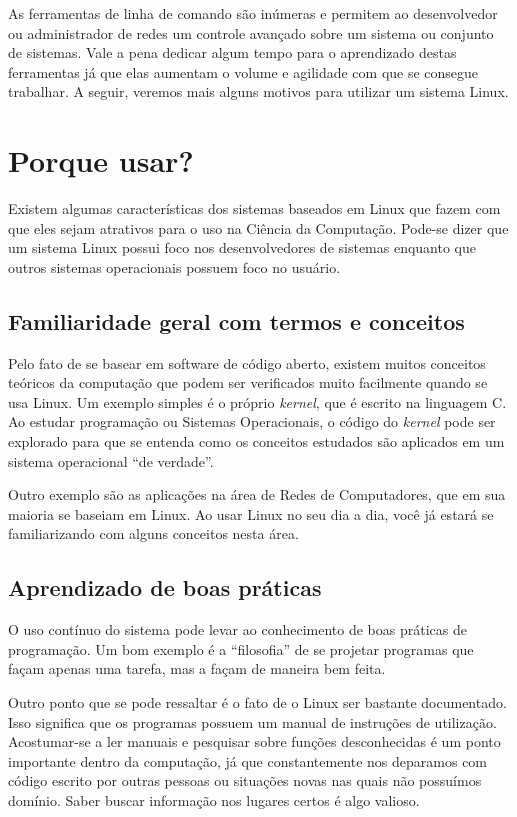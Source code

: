\documentclass{handout_utfpr}
\begin{document}
As ferramentas de linha de comando são inúmeras e permitem ao desenvolvedor ou administrador de redes um controle avançado sobre um sistema ou conjunto de sistemas. Vale a pena dedicar algum tempo para o aprendizado destas ferramentas já que elas aumentam o volume e agilidade com que se consegue trabalhar. A seguir, veremos mais alguns motivos para utilizar um sistema Linux.

\section{Porque usar?}
Existem algumas características dos sistemas baseados em Linux que fazem com que eles sejam atrativos para o uso na Ciência da Computação. Pode-se dizer que um sistema Linux possui foco nos desenvolvedores de sistemas enquanto que outros sistemas operacionais possuem foco no usuário.

\subsection{Familiaridade geral com termos e conceitos}
Pelo fato de se basear em software de código aberto, existem muitos conceitos teóricos da computação que podem ser verificados muito facilmente quando se usa Linux. Um exemplo simples é o próprio \textit{kernel}, que é escrito na linguagem C. Ao estudar programação ou Sistemas Operacionais, o código do \textit{kernel} pode ser explorado para que se entenda como os conceitos estudados são aplicados em um sistema operacional ``de verdade''.

Outro exemplo são as aplicações na área de Redes de Computadores, que em sua maioria se baseiam em Linux. Ao usar Linux no seu dia a dia, você já estará se familiarizando com alguns conceitos nesta área.

\subsection{Aprendizado de boas práticas}
O uso contínuo do sistema pode levar ao conhecimento de boas práticas de programação. Um bom exemplo é a ``filosofia'' de se projetar programas que façam apenas uma tarefa, mas a façam de maneira bem feita.

Outro ponto que se pode ressaltar é o fato de o Linux ser bastante documentado. Isso significa que os programas possuem um manual de instruções de utilização. Acostumar-se a ler manuais e pesquisar sobre funções desconhecidas é um ponto importante dentro da computação, já que constantemente nos deparamos com código escrito por outras pessoas ou situações novas nas quais não possuímos domínio. Saber buscar informação nos lugares certos é algo valioso.
\end{document}
